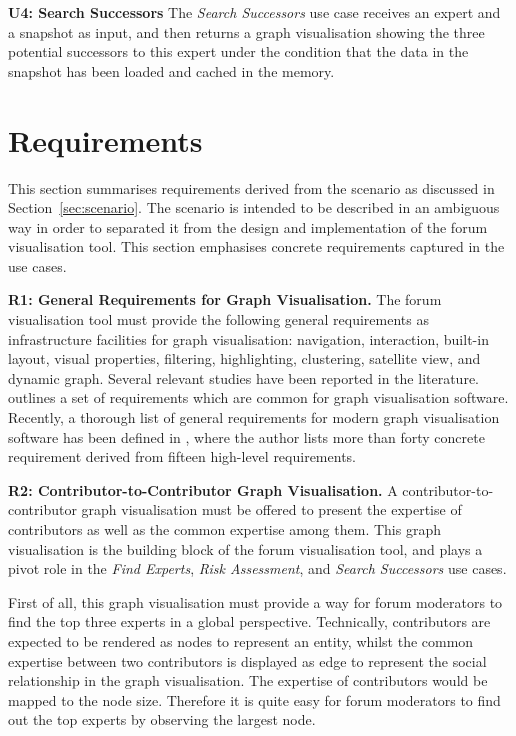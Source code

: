 \textbf{U4: Search Successors}
The \emph{Search Successors} use case receives an expert and a snapshot as input, and then returns a graph visualisation showing the three potential successors to this expert under the condition that the data in the snapshot has been loaded and cached in the memory.

\section{Requirements} \label{sec:requirements}
This section summarises requirements derived from the scenario as discussed in Section~\ref{sec:scenario}. The scenario is intended to be described in an ambiguous way in order to separated it from the design and implementation of the forum visualisation tool. This section emphasises concrete requirements captured in the use cases.

\textbf{R1: General Requirements for Graph Visualisation.}
The forum visualisation tool must provide the following general requirements as infrastructure facilities for graph visualisation: navigation, interaction, built-in layout, visual properties, filtering, highlighting, clustering, satellite view, and dynamic graph. Several relevant studies have been reported in the literature. \citep{Noik1992} outlines a set of requirements which are common for graph visualisation software. Recently, a thorough list of general requirements for modern graph visualisation software has been defined in \citep{Zabiniako2009}, where the author lists more than forty concrete requirement derived from fifteen high-level requirements.

\textbf{R2: Contributor-to-Contributor Graph Visualisation.}
A contributor-to-contributor graph visualisation must be offered to present the expertise of contributors as well as the common expertise among them. This graph visualisation is the building block of the forum visualisation tool, and plays a pivot role in the \emph{Find Experts}, \emph{Risk Assessment}, and \emph{Search Successors} use cases.

First of all, this graph visualisation must provide a way for forum moderators to find the top three experts in a global perspective. Technically, contributors are expected to be rendered as nodes to represent an entity, whilst the common expertise between two contributors is displayed as edge to represent the social relationship in the graph visualisation. The expertise of contributors would be mapped to the node size. Therefore it is quite easy for forum moderators to find out the top experts by observing the largest node.

